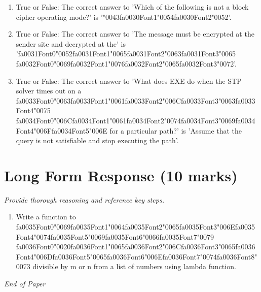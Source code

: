 \documentclass[12pt]{article}
\begin{document}
\begin{enumerate}[label=\arabic*.]
\item True or False: The correct answer to 'Which of the following is not a block cipher operating mode?' is '{\char"0043}{\csname fa0030Font1\endcsname\char"0054}{\csname fa0030Font2\endcsname\char"0052}'.
\item True or False: The correct answer to 'The message must be encrypted at the sender site and decrypted at the' is '{\csname fa0031Font0\endcsname\char"0052}{\csname fa0031Font1\endcsname\char"0065}{\csname fa0031Font2\endcsname\char"0063}{\csname fa0031Font3\endcsname\char"0065} {\csname fa0032Font0\endcsname\char"0069}{\csname fa0032Font1\endcsname\char"0076}{\csname fa0032Font2\endcsname\char"0065}{\csname fa0032Font3\endcsname\char"0072}'.
\item True or False: The correct answer to 'What does EXE do when the STP solver times out on a {\csname fa0033Font0\endcsname\char"0063}{\csname fa0033Font1\endcsname\char"0061}{\csname fa0033Font2\endcsname\char"006C}{\csname fa0033Font3\endcsname\char"0063}{\csname fa0033Font4\endcsname\char"0075} {\csname fa0034Font0\endcsname\char"006C}{\csname fa0034Font1\endcsname\char"0061}{\csname fa0034Font2\endcsname\char"0074}{\csname fa0034Font3\endcsname\char"0069}{\csname fa0034Font4\endcsname\char"006F}{\csname fa0034Font5\endcsname\char"006E} for a particular path?' is 'Assume that the query is not satisfiable and stop executing the path'.
\end{enumerate}

\section*{Long Form Response (10 marks)}
\textit{Provide thorough reasoning and reference key steps.}
\begin{enumerate}[label=\arabic*.]
\item Write a function to {\csname fa0035Font0\endcsname\char"0069}{\csname fa0035Font1\endcsname\char"0064}{\csname fa0035Font2\endcsname\char"0065}{\csname fa0035Font3\endcsname\char"006E}{\csname fa0035Font4\endcsname\char"0074}{\csname fa0035Font5\endcsname\char"0069}{\csname fa0035Font6\endcsname\char"0066}{\csname fa0035Font7\endcsname\char"0079} {\csname fa0036Font0\endcsname\char"0020}{\csname fa0036Font1\endcsname\char"0065}{\csname fa0036Font2\endcsname\char"006C}{\csname fa0036Font3\endcsname\char"0065}{\csname fa0036Font4\endcsname\char"006D}{\csname fa0036Font5\endcsname\char"0065}{\csname fa0036Font6\endcsname\char"006E}{\csname fa0036Font7\endcsname\char"0074}{\csname fa0036Font8\endcsname\char"0073} divisible by m or n from a list of numbers using lambda
function.
\end{enumerate}

\vfill
\noindent\textit{End of Paper}
\end{document}
